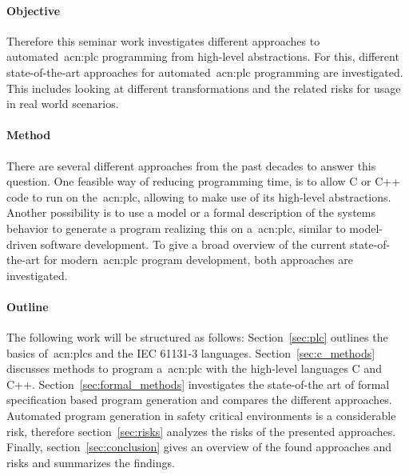 \paragraph{Objective}
Therefore this seminar work investigates different approaches to automated~\gls{acn:plc} programming from high-level abstractions.
For this, different state-of-the-art approaches for automated~\gls{acn:plc} programming are investigated.
This includes looking at different transformations and the related risks for usage in real world scenarios.
\paragraph{Method}
There are several different approaches from the past decades to answer this question.
One feasible way of reducing programming time, is to allow C or C++ code to run on the~\gls{acn:plc}, allowing to make use of its high-level abstractions.
Another possibility is to use a model or a formal description of the systems behavior to generate a program realizing this on a~\gls{acn:plc}, similar to model-driven software development.
To give a broad overview of the current state-of-the-art for modern~\gls{acn:plc} program development, both approaches are investigated.
\paragraph{Outline}
The following work will be structured as follows: 
Section~\ref{sec:plc} outlines the basics of~\glspl{acn:plc} and the IEC 61131-3 languages. 
Section~\ref{sec:c_methods} discusses methods to program a~\gls{acn:plc} with the high-level languages C and C++.
Section~\ref{sec:formal_methods} investigates the state-of-the art of formal specification based program generation and compares the different approaches.
Automated program generation in safety critical environments is a considerable risk, therefore section~\ref{sec:risks} analyzes the risks of the presented approaches.
Finally, section~\ref{sec:conclusion} gives an overview of the found approaches and risks and summarizes the findings.